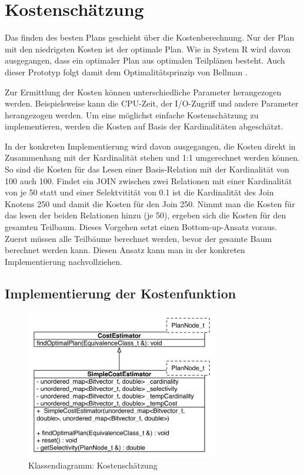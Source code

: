 \section{Kostenschätzung}

Das finden des besten Plans geschieht über die Kostenberechnung. Nur der Plan mit den niedrigsten Kosten ist der optimale Plan. Wie in System R wird davon ausgegangen, dass ein optimaler Plan aus optimalen Teilplänen besteht. Auch dieser Prototyp folgt damit dem Optimalitätsprinzip von Bellman \cite{Bellman:1957}.

Zur Ermittlung der Kosten können unterschiedliche Parameter herangezogen werden. Beispielsweise kann die CPU-Zeit, der I/O-Zugriff und andere Parameter herangezogen werden. Um eine möglichst einfache Kostenschätzung zu implementieren, werden die Kosten auf Basis der Kardinalitäten abgeschätzt.

In der konkreten Implementierung wird davon ausgegangen, die Kosten direkt in Zusammenhang mit der Kardinalität stehen und 1:1 umgerechnet werden können. So sind die Kosten für das Lesen einer Basis-Relation mit der Kardinalität von 100 auch 100. Findet ein JOIN zwischen zwei Relationen mit einer Kardinalität von je 50 statt und einer Selektvitität von 0.1 ist die Kardinalität des Join Knotens 250 und damit die Kosten für den Join 250. Nimmt man die Kosten für das lesen der beiden Relationen hinzu (je 50), ergeben sich die Kosten für den gesamten Teilbaum. Dieses Vorgehen setzt einen Bottom-up-Ansatz voraus. Zuerst müssen alle Teilbäume berechnet werden, bevor der gesamte Baum berechnet werden kann. Diesen Ansatz kann man in der konkreten Implementierung nachvollziehen.

\subsection{Implementierung der Kostenfunktion}


\begin{figure}[ht]
  \centering
  \includegraphics[width=0.75\textwidth]{04_Implementierung/00_media/ClassCostEstimation.pdf}
  \caption{Klassendiagramm: Kostenschätzung}
  \label{ClassCostEstimation}
\end{figure}



